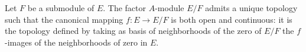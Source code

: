 Let $F$ be a submodule of $E$. The factor $A$-module $E/F$ admits a unique topology such that the canonical mapping $f: E \to E/F$ is both open and continuous: it is the topology defined by taking as basis of neighborhoods of the zero of $E/F$ the $f$-images of the neighborhoods of zero in $E$.